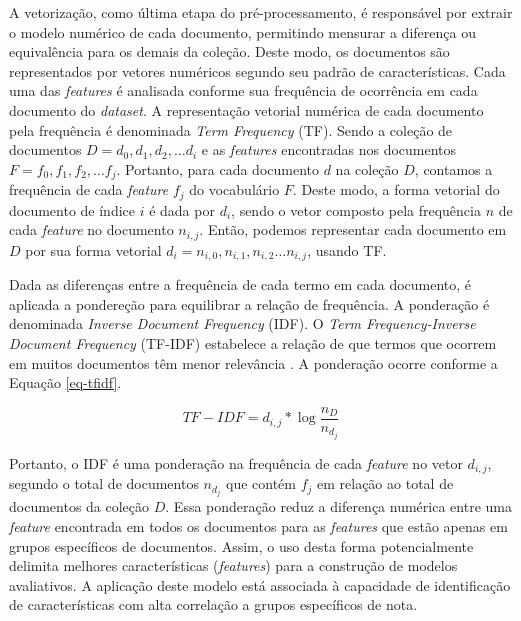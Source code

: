 A vetorização, como última etapa do pré-processamento, é responsável por extrair o modelo numérico de cada documento, permitindo mensurar a diferença ou equivalência para os demais da coleção. Deste modo, os documentos são representados por vetores numéricos segundo seu padrão de características. Cada uma das \textit{features} é analisada conforme sua frequência de ocorrência em cada documento do \textit{dataset}. A representação vetorial numérica de cada documento pela frequência é denominada \textit{Term Frequency} (TF). Sendo a coleção de documentos $ D = { d_{0}, d_{1}, d_{2}, \hdots d_{i} } $ e as \textit{features} encontradas nos documentos $ F = { f_{0}, f_{1}, f_{2}, \hdots f_{j} } $.  Portanto, para cada documento $ d $ na coleção $ D $, contamos a frequência de cada \textit{feature} $ f_{j} $ do vocabulário $ F $. Deste modo, a forma vetorial do documento de índice $ i $ é dada por $ d_{i} $, sendo o vetor composto pela frequência $ n $ de cada \textit{feature} no documento $ n_{i, j} $. Então, podemos representar cada documento em $ D $ por sua forma vetorial $ d_{i} = { n_{i, 0}, n_{i, 1}, n_{i, 2} \hdots n_{i,j}} $, usando TF.

Dada as diferenças entre a frequência de cada termo em cada documento, é aplicada a pondereção para equilibrar a relação de frequência. A ponderação é denominada \textit{Inverse Document Frequency} (IDF). O \textit{Term Frequency-Inverse Document Frequency} (TF-IDF) estabelece a relação de que termos que ocorrem em muitos documentos têm menor relevância \cite{baeza2011}. A ponderação ocorre conforme a Equação \ref{eq-tfidf}.

\begin{equation}
TF-IDF = d_{i,j}* \log \frac{n_{D}}{n_{d_{j}}}
\label{eq-tfidf}
\end{equation}

Portanto, o IDF é uma ponderação na frequência de cada \textit{feature} no vetor $ d_{i, j} $, segundo o total de documentos $ n_{d_{j}} $ que contém $ f_{j} $ em relação ao total de documentos da coleção $ D $. Essa ponderação reduz a diferença numérica entre uma \textit{feature} encontrada em todos os documentos para as \textit{features} que estão apenas em grupos específicos de documentos. Assim, o uso desta forma potencialmente delimita melhores características (\textit{features}) para a construção de modelos avaliativos. A aplicação deste modelo está associada à capacidade de identificação de características com alta correlação a grupos específicos de nota.

